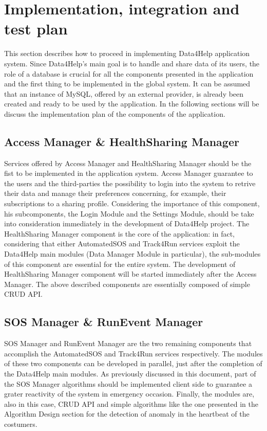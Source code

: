 \documentclass[DD.tex]{subfiles}
\begin{document}
\section{Implementation, integration and test plan}
This section describes how to proceed in implementing Data4Help application system.
Since Data4Help's main goal is to handle and share data of its users, the role of a database is crucial for all the components presented in the application and the first thing to be implemented in the global system. 
It can be assumed that an instance of MySQL, offered by an external provider, is already been created and ready to be used by the application. \newline
In the following sections will be discuss the implementation plan of the components of the application. 

\subsection{Access Manager \& HealthSharing Manager}
Services offered by Access Manager and HealthSharing Manager should be the fist to be implemented in the application system. \newline
Access Manager guarantee to the users and the third-parties the possibility to login into the system to retrive their data and manage their preferences concerning, for example, their subscriptions to a sharing profile. 
Considering the importance of this component, his subcomponents, the Login Module and the Settings Module, should be take into consideration immediately in the development of Data4Help project.
\newline
The HealthSharing Manager component is the core of the application: in fact, considering that either AutomatedSOS and Track4Run services exploit the Data4Help main modules (Data Manager Module in particular), the sub-modules of this component are essential for the entire system.  
The development of HealthSharing Manager component will be started immediately after the Access Manager. 
The above described components are essentially composed of simple CRUD API. 

\subsection{SOS Manager \& RunEvent Manager}
SOS Manager and RunEvent Manager are the two remaining components that accomplish the AutomatedSOS and Track4Run services respectively. \newline The modules of these two components can be developed in parallel, just after the completion of the Data4Help main modules. 
As previously discussed in this document, part of the SOS Manager algorithms should be implemented client side to guarantee a grater reactivity of the system in emergency occasion. \newline
Finally, the modules are, also in this case, CRUD API and simple algorithms like the one presented in the Algorithm Design section for the detection of anomaly in the heartbeat of the costumers. 
\end{document}
